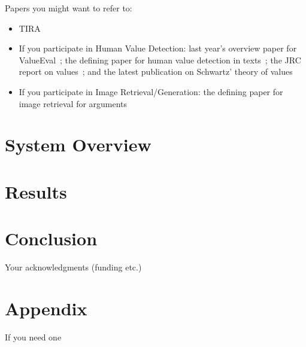\documentclass{ceurart}
\begin{document}
Papers you might want to refer to:
\begin{itemize}
\item
TIRA~\cite{froebe:2023b}
\item
If you participate in Human Value Detection:
last year's overview paper for ValueEval~\cite{kiesel:2023};
the defining paper for human value detection in texts~\cite{kiesel:2022};
the JRC report on values~\cite{scharfbillig:2021}; and
the latest publication on Schwartz' theory of values~\cite{schwartz:2012}
\item
If you participate in Image Retrieval/Generation:
the defining paper for image retrieval for arguments~\cite{kiesel:2021}
\end{itemize}


\section{System Overview}


\section{Results}


\section{Conclusion}




\begin{acknowledgments}
Your acknowledgments (funding etc.)
\end{acknowledgments}



\appendix
\section{Appendix}
If you need one
\end{document}
